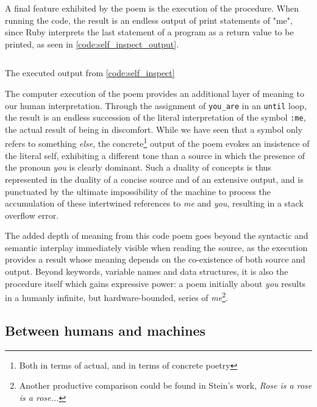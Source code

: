A final feature exhibited by the poem is the execution of the procedure. When running the code, the result is an endless output of print statements of "me", since Ruby interprets the last statement of a program as a return value to be printed, as seen in \ref{code:self_inspect_output}.

\begin{listing}
  \inputminted{text}{./corpus/self_inspect.txt}
  \caption{The executed output from \ref{code:self_inspect}}
  \label{code:self_inspect_output}
\end{listing}


The computer execution of the poem provides an additional layer of meaning to our human interpretation. Through the assignment of \lstinline{you_are} in an \lstinline{until} loop, the result is an endless succession of the literal interpretation of the symbol \lstinline{:me}, the actual result of being in discomfort. While we have seen that a symbol only refers to something \emph{else}, the concrete\footnote{Both in terms of actual, and in terms of concrete poetry} output of the poem evokes an insistence of the literal self, exhibiting a different tone than a source in which the presence of the pronoun \emph{you} is clearly dominant. Such a duality of concepts is thus represented in the duality of a concise source and of an extensive output, and is punctuated by the ultimate impossibility of the machine to process the accumulation of these intertwined references to \emph{me} and \emph{you}, resulting in a stack overflow error.

The added depth of meaning from this code poem goes beyond the syntactic and semantic interplay immediately visible when reading the source, as the execution provides a result whose meaning depends on the co-existence of both source and output. Beyond keywords, variable names and data structures, it is also the procedure itself which gains expressive power: a poem initially about \emph{you} results in a humanly infinite, but hardware-bounded, series of \emph{me}\footnote{Another productive comparison could be found in Stein's work, \emph{Rose is a rose is a rose...}}.


\subsection{Between humans and machines}
\label{subsec:humans-machines}

